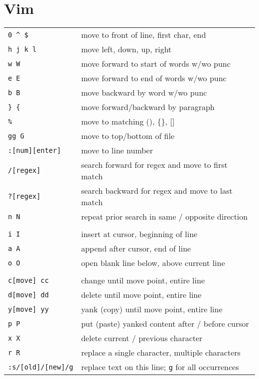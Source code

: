 \documentclass[10pt,twoside,openright]{memoir}
\begin{document}
\pagestyle{empty}


\chapter{Vim}

{\footnotesize
\begin{tabular}{ll}
\texttt{0 \^{} \$} & move to front of line, first char, end \\
\texttt{h j k l} & move left, down, up, right \\
\texttt{w W} & move forward to start of words w/wo punc \\
\texttt{e E} & move forward to end of words w/wo punc \\
\texttt{b B} & move backward by word w/wo punc \\
\texttt{\} \{} & move forward/backward by paragraph \\
\texttt{\%} & move to matching (), \{\}, [] \\
\texttt{gg G} & move to top/bottom of file \\
\texttt{:[num][enter]} & move to line number \\
\texttt{/[regex]} & search forward for regex and move to first match \\
\texttt{?[regex]} & search backward for regex and move to last match \\
\texttt{n N} & repeat prior search in same / opposite direction \\
& \\
\texttt{i I} & insert at cursor, beginning of line \\
\texttt{a A} & append after cursor, end of line \\
\texttt{o O} & open blank line below, above current line \\
& \\
\texttt{c[move] cc} & change until move point, entire line \\
\texttt{d[move] dd} & delete until move point, entire line \\
\texttt{y[move] yy} & yank (copy) until move point, entire line \\
\texttt{p P} & put (paste) yanked content after / before cursor \\
\texttt{x X} & delete current / previous character \\
\texttt{r R} & replace a single character, multiple characters\\
\texttt{:s/[old]/[new]/g} & replace text on this line; \texttt{g} for all occurrences \\

\end{tabular}}
\end{document}
